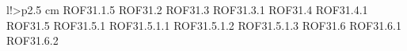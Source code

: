 \begin{tabella}{l!{\VRule}>{\centering\arraybackslash}p{2.5 cm}}
\linebreak ROF31.1.5 \linebreak ROF31.2 \linebreak ROF31.3 \linebreak ROF31.3.1 \linebreak ROF31.4 \linebreak ROF31.4.1 \linebreak ROF31.5 \linebreak ROF31.5.1 \linebreak ROF31.5.1.1 \linebreak ROF31.5.1.2 \linebreak ROF31.5.1.3 \linebreak ROF31.6 \linebreak ROF31.6.1 \linebreak ROF31.6.2 \
\end{tabella}

